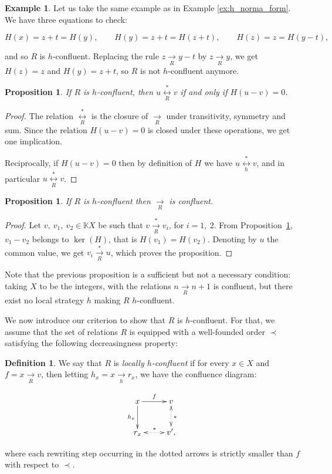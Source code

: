 \documentclass[10pt]{easychair}
\newtheorem{proposition}[theorem]{Proposition}
\theoremstyle{definition}
\newtheorem{definition}[theorem]{Definition}
\newtheorem{example}[theorem]{Example}
\newcommand\K{\mathbb{K}}
\newcommand\KX{\K X}
\newcommand\rewR{\underset{R}{\longrightarrow}}
\newcommand\rewh{\underset{h}{\longrightarrow}}
\newcommand\transR{\overset{*}{\rewR}}
\newcommand\equivR{\underset{R}{\overset{*}{\longleftrightarrow}}}
\newcommand\equivh{\underset{h}{\overset{*}{\longleftrightarrow}}}
\begin{document}
\begin{example}
  Let us take the same example as in Example \ref{ex:h_norma_form}. We have three equations to check:
  \begin{small}
    \[
    H(x) = z + t = H(y),\qquad H(y) = z + t = H(z + t),\qquad H(z) = z = H(y - t),
    \]
  \end{small}
    and so $R$ is $h$-confluent. Replacing the rule $z \rewR y - t$ by $z \rewR y$, we get $H(z) = z$ and $H(y) = z + t$, so $R$ is not $h$-confluent anymore. 
\end{example}

\begin{proposition}\label{prop:equationnal_theory}
  If $R$ is $h$-confluent, then
  $u \equivR v$ if and only if $H(u-v)=0$.
\end{proposition}

\begin{proof}
The relation $\equivR$ is the closure of $\rewR$ under transitivity, symmetry and sum. Since the relation $H(u - v) = 0$ is closed under these operations, we get one implication.

Reciprocally, if $H(u - v) = 0$ then by definition of $H$ we have $u \equivh v$, and in particular $u \equivR v$.
\end{proof}

\begin{proposition}\label{prop:h-conf_implies_conf}
If $R$ is $h$-confluent then $\rewR$ is confluent.
\end{proposition}
\begin{proof}
  Let $v,\ v_1,\ v_2\in\KX$ be such that $v\transR v_i$, for $i=1,\ 2$.
  From Proposition~\ref{prop:equationnal_theory}, $v_1-v_2$ belongs to
  $\ker(H)$, that is $H(v_1)=H(v_2)$. Denoting by $u$ the common value, we get
  $v_i\transR u$, which proves the proposition.
\end{proof}

Note that the previous proposition is a sufficient but not a necessary condition: taking $X$ to be the integers, with the relations $n \rewR n+1$ is confluent, but there exist no local strategy $h$ making $R$ $h$-confluent. 

We now introduce our criterion to show that $R$ is $h$-confluent. For that, we assume that the set of relations $R$ is equipped with a well-founded order $\prec$ satisfying the following decreasingness property:

\begin{definition}\label{proper:decreasingness_property}
  We say that $R$ is \emph{locally $h$-confluent} if for every
  $x \in X$ and $f=x\rewR v$, then letting $h_x=x\rewh r_x$, we
  have the confluence diagram:
  \begin{small}
    \[
    \xymatrix @C = 2.5em @R = 2.5em{
      x 
      \ar [r] ^{f}
      \ar[d] _{h_x}
      &
      v
      \ar@{<.>} [d] ^{*}
      \\
      r_x
      \ar@{<.>} [r] ^{*}
      & 
      v',
    }
    \]
  \end{small}
  where each rewriting step occurring in the dotted arrows is strictly
  smaller than $f$ with respect to  $\prec$.
\end{definition}
\end{document}
